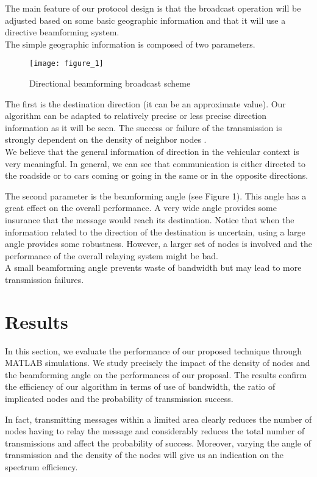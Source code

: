 \documentclass{IEEEtran}
\begin{document}
The main feature of our protocol design is that the broadcast
operation will be adjusted based on some basic geographic
information and that it will use a directive beamforming system.
\\
The simple geographic information is composed of two parameters.

\begin{figure}[!htbp]
  \centering
\texttt{[image: figure\_1]}
 \caption{Directional beamforming broadcast scheme}
 
 
\end{figure}


The first is  the destination direction (it can be an approximate
value). Our algorithm can be adapted to relatively precise or less
precise direction information as it will be seen. The success or
failure of the transmission is strongly
dependent on the density of neighbor nodes  .\\
We believe that the general information of direction in the
vehicular context is very meaningful. In general, we can see that
communication is either directed to the roadside or to cars coming
or going in the same or in the opposite directions.

The second parameter is the beamforming angle  (see Figure
1). This angle has a great effect on the overall performance. A very
wide angle provides some insurance that the message would reach its
destination. Notice that when the information related to the
direction of the destination is uncertain, using a large angle
provides some robustness. However, a larger set of nodes is involved
and the performance of the overall relaying system might be bad. \\
A small beamforming angle prevents waste of bandwidth
but may lead to more transmission failures.

\section{Results}

In this section, we evaluate the performance of our proposed
technique through MATLAB simulations. We study precisely the impact
of the density of nodes and the beamforming angle on the
performances of our proposal. The results confirm the efficiency of
our algorithm in terms of use of bandwidth, the ratio of implicated
nodes and the probability of transmission success.

In fact, transmitting messages within a limited area clearly reduces
the number of nodes having to relay the message and considerably
reduces the total number of transmissions and affect the probability
of success. Moreover, varying the angle of transmission  and
the density of the nodes will give us an indication on the spectrum
efficiency.
\end{document}
